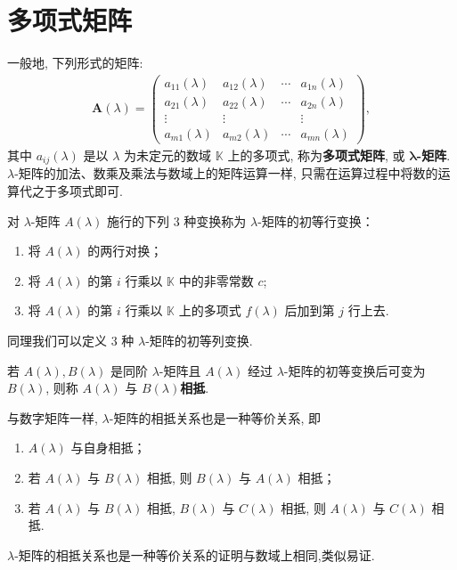 \documentclass[../../main.tex]{subfiles}
\begin{document}
\section{多项式矩阵}

\begin{definition}[$\lambda$-矩阵]
一般地, 下列形式的矩阵:
\begin{align*}
\boldsymbol{A}(\lambda)=
\begin{pmatrix}
a_{11}(\lambda) & a_{12}(\lambda) & \cdots & a_{1n}(\lambda) \\
a_{21}(\lambda) & a_{22}(\lambda) & \cdots & a_{2n}(\lambda) \\
\vdots & \vdots & & \vdots \\
a_{m1}(\lambda) & a_{m2}(\lambda) & \cdots & a_{mn}(\lambda)
\end{pmatrix},
\end{align*}
其中 $a_{ij}(\lambda)$ 是以 $\lambda$ 为未定元的数域 $\mathbb{K}$ 上的多项式, 称为\textbf{多项式矩阵}, 或 $\boldsymbol{\lambda}$\textbf{-矩阵}. $\lambda$-矩阵的加法、数乘及乘法与数域上的矩阵运算一样, 只需在运算过程中将数的运算代之于多项式即可.
\end{definition}

\begin{definition}
对 $\lambda$-矩阵 $A(\lambda)$ 施行的下列 3 种变换称为 $\lambda$-矩阵的初等行变换：
\begin{enumerate}[(1)]
\item 将 $A(\lambda)$ 的两行对换；

\item 将 $A(\lambda)$ 的第 $i$ 行乘以 $\mathbb{K}$ 中的非零常数 $c$;

\item 将 $A(\lambda)$ 的第 $i$ 行乘以 $\mathbb{K}$ 上的多项式 $f(\lambda)$ 后加到第 $j$ 行上去.
\end{enumerate}

同理我们可以定义 3 种 $\lambda$-矩阵的初等列变换.
\end{definition}

\begin{definition}
若 $A(\lambda),B(\lambda)$ 是同阶 $\lambda$-矩阵且 $A(\lambda)$ 经过 $\lambda$-矩阵的初等变换后可变为 $B(\lambda)$, 则称 $A(\lambda)$ 与 $B(\lambda)$\textbf{相抵}.

与数字矩阵一样, $\lambda$-矩阵的相抵关系也是一种等价关系, 即
\begin{enumerate}[(1)]
\item $A(\lambda)$ 与自身相抵；

\item 若 $A(\lambda)$ 与 $B(\lambda)$ 相抵, 则 $B(\lambda)$ 与 $A(\lambda)$ 相抵；

\item 若 $A(\lambda)$ 与 $B(\lambda)$ 相抵, $B(\lambda)$ 与 $C(\lambda)$ 相抵, 则 $A(\lambda)$ 与 $C(\lambda)$ 相抵.
\end{enumerate}
\end{definition}
\begin{note}
$\lambda$-矩阵的相抵关系也是一种等价关系的证明与数域上相同,类似易证.
\end{note}
\end{document}
